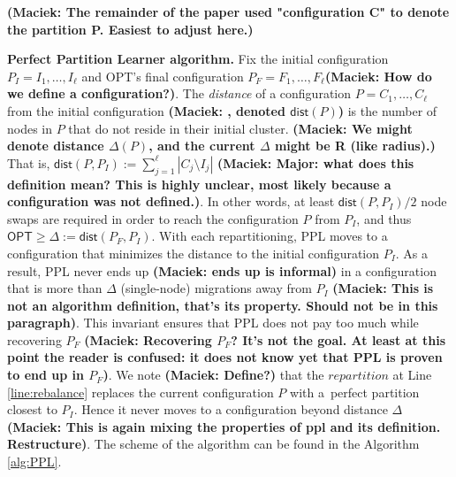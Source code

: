 \documentclass[manuscript,screen=true, review, anonymous]{acmart}
\newcommand{\OPT}{\textsf{OPT}\xspace}
\newcommand{\PPL}{\textsf{PPL}\xspace}
\newcommand{\dist}{\textsf{dist}}
\newcommand\maciek[1]{\color{brown}\textbf{(Maciek: #1)}\color{black}}
\begin{document}
\maciek{The remainder of the paper used "configuration C" to denote the partition P. Easiest to adjust here.}

\noindent
\textbf{Perfect Partition Learner algorithm.}
Fix the initial configuration
$P_I = I_1, \dots, I_{\ell}$ and \OPT's final configuration
$P_F = F_1, \dots, F_{\ell}$\maciek{How do we define a configuration?}.
The \emph{distance} of a configuration $P = C_1, \dots, C_{\ell}$ from the initial configuration \maciek{, denoted $\dist(P)$} is the number of nodes in $P$ that do not reside in their initial cluster.
\maciek{We might denote distance $\Delta(P)$, and the current $\Delta$ might be R (like radius).}
That is,
$\dist(P, P_I) := \sum_{j=1}^{\ell} | C_j \setminus I_j |$
\maciek{Major: what does this definition mean? This is highly unclear, most likely because a configuration was not defined.}. 
In other words,
at least $\dist(P, P_I)/2$ node swaps are required in order to reach the configuration $P$ from $P_I$, and thus
$\OPT \geq \Delta:= \dist(P_F, P_I) $.
With each repartitioning,
\PPL moves to a configuration that minimizes the distance to the initial configuration $P_I$.
As a result,
\PPL never ends up \maciek{ends up is informal} in a configuration that is more than $\Delta$ (single-node) migrations away from $P_I$ \maciek{This is not an algorithm definition, that's its property. Should not be in this paragraph}.
This invariant ensures that \PPL does not pay too much while recovering $P_F$ \maciek{Recovering $P_F$? It's not the goal. At least at this point the reader is confused: it does not know yet that PPL is proven to end up in $P_F$}.
We note \maciek{Define?} that the $\mathit{repartition}$ at Line \ref{line:rebalance} replaces the current configuration $P$ with a~perfect partition closest to $P_I$.
Hence it never moves to a configuration beyond distance $\Delta$ \maciek{This is again mixing the properties of ppl and its definition. Restructure}.
The scheme of the algorithm can be found in the Algorithm \ref{alg:PPL}.
\end{document}
